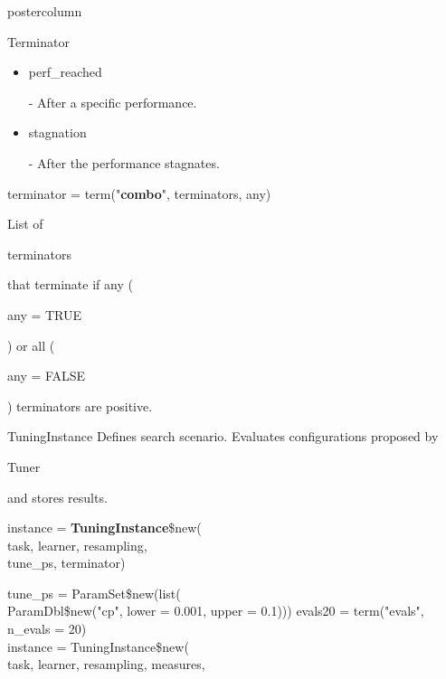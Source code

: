\documentclass{beamer}
\newcommand{\codeinline}[1]{\begin{codeboxinline}#1\end{codeboxinline}}
\begin{document}
\begin{frame}[fragile]{}
\begin{columns}
\begin{column}{.245\textwidth}
\begin{beamercolorbox}[center]{postercolumn}
\begin{minipage}{.98\textwidth}
{\begin{myblock}{Terminator}
\begin{itemize}
								\item \codeinline{perf\_reached} - After a specific performance.
								\item \codeinline{stagnation} - After the performance stagnates.
							\end{itemize}
							\vspace{1.0cm}
							\begin{codebox}
								terminator = term("\textbf{combo}", terminators, any)
							\end{codebox}
							List of \codeinline{terminators} that terminate if any (\codeinline{any = TRUE}) or all (\codeinline{any = FALSE}) terminators are positive.
						\end{myblock}
						\begin{myblock}{TuningInstance}
							Defines search scenario. Evaluates configurations proposed by \codeinline{Tuner} and stores results. 
							\\
							\begin{codeboxmultiline}[width=20cm]
								instance = \textbf{TuningInstance}\$new(\\
								\hspace*{1ex}task, learner, resampling,\\
								\hspace*{1ex}tune\_ps, terminator)
							\end{codeboxmultiline}
						\vspace{1em}
						\begin{codeboxexample}
							\footnotesize{
							tune\_ps = ParamSet\$new(list(\\
							\hspace*{1ex} ParamDbl\$new("cp", lower = 0.001, upper = 0.1)))
							evals20 = term("evals", n\_evals = 20)
							\vspace{1em}
							\\
							instance = TuningInstance\$new(\\
							\hspace*{1ex} task, learner, resampling, measures,\\
}
\end{codeboxexample}
\end{myblock}}
\end{minipage}
\end{beamercolorbox}
\end{column}
\end{columns}
\end{frame}
\end{document}
